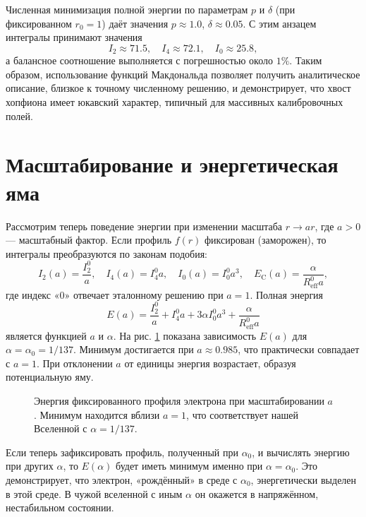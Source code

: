 \documentclass[12pt]{article}
\begin{document}
Численная минимизация полной энергии по параметрам $p$ и $\delta$ (при фиксированном $r_0=1$) даёт значения $p \approx 1.0$, $\delta \approx 0.05$. С этим анзацем интегралы принимают значения
\[
I_2 \approx 71.5,\quad I_4 \approx 72.1,\quad I_0 \approx 25.8,
\]
а балансное соотношение выполняется с погрешностью около $1\%$. Таким образом, использование функций Макдональда позволяет получить аналитическое описание, близкое к точному численному решению, и демонстрирует, что хвост хопфиона имеет юкавский характер, типичный для массивных калибровочных полей.

\section{Масштабирование и энергетическая яма}
\label{sec:scaling}

Рассмотрим теперь поведение энергии при изменении масштаба $r \to a r$, где $a>0$ --- масштабный фактор. Если профиль $f(r)$ фиксирован (заморожен), то интегралы преобразуются по законам подобия:
\[
I_2(a) = \frac{I_2^0}{a},\quad I_4(a) = I_4^0 a,\quad I_0(a) = I_0^0 a^3,\quad E_{\text{C}}(a) = \frac{\alpha}{R_{\text{eff}}^0 a},
\]
где индекс «0» отвечает эталонному решению при $a=1$. Полная энергия
\begin{equation}
E(a) = \frac{I_2^0}{a} + I_4^0 a + 3\alpha I_0^0 a^3 + \frac{\alpha}{R_{\text{eff}}^0 a}
\label{eq:E_scaled}
\end{equation}
является функцией $a$ и $\alpha$. На рис. \ref{fig:well} показана зависимость $E(a)$ для $\alpha = \alpha_0 = 1/137$. Минимум достигается при $a \approx 0.985$, что практически совпадает с $a=1$. При отклонении $a$ от единицы энергия возрастает, образуя потенциальную яму.

\begin{figure}[h]
\centering
\caption{Энергия фиксированного профиля электрона при масштабировании $a$. Минимум находится вблизи $a=1$, что соответствует нашей Вселенной с $\alpha=1/137$.}
\label{fig:well}
\end{figure}

Если теперь зафиксировать профиль, полученный при $\alpha_0$, и вычислять энергию при других $\alpha$, то $E(\alpha)$ будет иметь минимум именно при $\alpha=\alpha_0$. Это демонстрирует, что электрон, «рождённый» в среде с $\alpha_0$, энергетически выделен в этой среде. В чужой вселенной с иным $\alpha$ он окажется в напряжённом, нестабильном состоянии.
\end{document}

